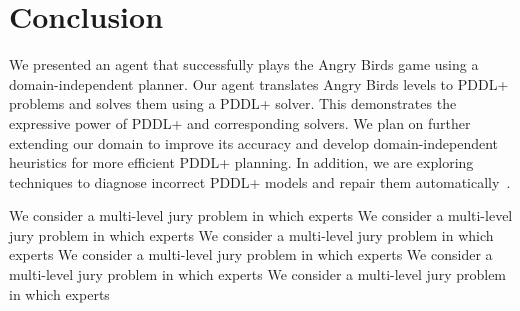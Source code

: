 \documentclass[letterpaper]{article} %
\begin{document}
\section{Conclusion}




We presented an agent that successfully plays the Angry Birds game  using a domain-independent planner.
Our agent translates Angry Birds levels to PDDL+ problems and solves them using a PDDL+ solver.
This demonstrates the expressive power of PDDL+ and corresponding solvers.
We plan on further extending our domain to improve its accuracy and develop domain-independent heuristics for more efficient PDDL+ planning.
In addition, we are exploring techniques to diagnose incorrect PDDL+ models and repair them automatically~\cite{klenk2020model}.






\small
We consider a multi-level jury problem in which experts
We consider a multi-level jury problem in which experts
We consider a multi-level jury problem in which experts
We consider a multi-level jury problem in which experts
We consider a multi-level jury problem in which experts
We consider a multi-level jury problem in which experts
\clearpage

\end{document}
